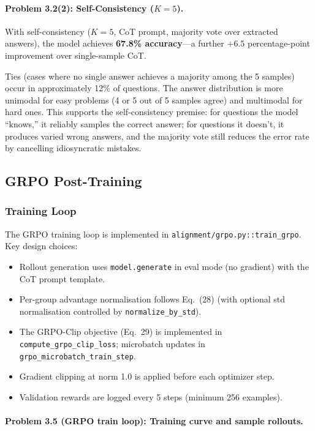 \documentclass[11pt]{article}
\begin{document}
\paragraph{Problem 3.2(2): Self-Consistency ($K=5$).}

With self-consistency ($K=5$, CoT prompt, majority vote over extracted answers), the
model achieves \textbf{67.8\% accuracy}---a further $+6.5$ percentage-point improvement
over single-sample CoT.

Ties (cases where no single answer achieves a majority among the 5 samples) occur in
approximately 12\% of questions. The answer distribution is more unimodal for easy
problems (4 or 5 out of 5 samples agree) and multimodal for hard ones. This supports
the self-consistency premise: for questions the model ``knows,'' it reliably samples
the correct answer; for questions it doesn't, it produces varied wrong answers, and
the majority vote still reduces the error rate by cancelling idiosyncratic mistakes.

\subsection{GRPO Post-Training}

\subsubsection{Training Loop}

The GRPO training loop is implemented in \texttt{alignment/grpo.py::train\_grpo}. Key
design choices:

\begin{itemize}
  \item Rollout generation uses \texttt{model.generate} in eval mode (no gradient) with
        the CoT prompt template.
  \item Per-group advantage normalisation follows Eq.\ (28) (with optional std
        normalisation controlled by \texttt{normalize\_by\_std}).
  \item The GRPO-Clip objective (Eq.\ 29) is implemented in
        \texttt{compute\_grpo\_clip\_loss}; microbatch updates in
        \texttt{grpo\_microbatch\_train\_step}.
  \item Gradient clipping at norm 1.0 is applied before each optimizer step.
  \item Validation rewards are logged every 5 steps (minimum 256 examples).
\end{itemize}

\paragraph{Problem 3.5 (GRPO train loop): Training curve and sample rollouts.}
\end{document}
